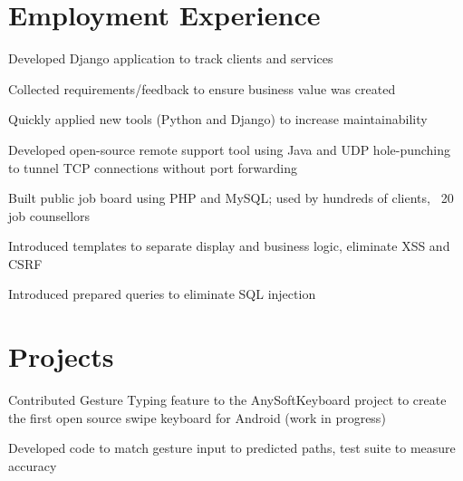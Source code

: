 \documentclass[]{deedy-resume-openfont}
\begin{document}
\begin{minipage}[t]{0.67\textwidth} 


\section{Employment Experience}
\sectionsep

\vspace{\topsep} %
\begin{tightemize}
\item Developed Django application to track clients and services
\item Collected requirements/feedback to ensure business value was created
\item Quickly applied new tools (Python and Django) to increase maintainability
\end{tightemize}
\sectionsep

\begin{tightemize}
\item Developed open-source remote support tool using Java and UDP hole-punching to tunnel TCP connections without port forwarding
\item Built public job board using PHP and MySQL; used by hundreds of clients, ~20 job counsellors
\item Introduced templates to separate display and business logic, eliminate XSS and CSRF
\item Introduced prepared queries to eliminate SQL injection
\end{tightemize}
\sectionsep

\section{Projects}
\begin{tightemize}
\item Contributed Gesture Typing feature to the AnySoftKeyboard project to create the first open source swipe keyboard for Android (work in progress)
\item Developed code to match gesture input to predicted paths, test suite to measure accuracy
\end{tightemize}
\sectionsep


\end{minipage}
\end{document}
